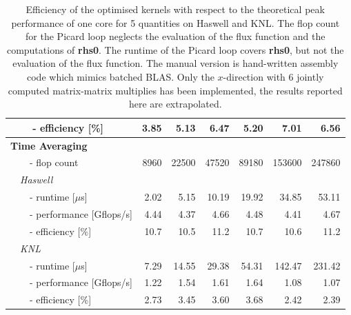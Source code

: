 \documentclass{acm_proc_article-sp}
\begin{document}
\begin{table}
\begin{tabular}{l|rrrrrr}
 ~~~~- efficiency [\%]                  & 3.85 & 5.13 & 6.47& 5.20 & 7.01 & 6.56  \\ \hline
\textbf{Time Averaging}                  &&&&& \\ 
 ~~~~- flop count                            & 8960 & 22500 & 47520 & 89180 & 153600 & 247860 \\
~~\textit{Haswell}            &&&&&&\\
 ~~~~- runtime [$\mu$s]                      & 2.02  & 5.15   & 10.19   & 19.92    & 34.85    & 53.11  \\
 ~~~~- performance [Gflops/s]                & 4.44  & 4.37   & 4.66   & 4.48    & 4.41    & 4.67  \\
 ~~~~- efficiency [\%]                       & 10.7  & 10.5   & 11.2   & 10.7    & 10.6    & 11.2  \\
~~\textit{KNL}            &&&&&&\\
 ~~~~- runtime [$\mu$s]                      & 7.29  & 14.55   & 29.38   & 54.31    & 142.47    & 231.42  \\
 ~~~~- performance [Gflops/s]                &  1.22 & 1.54   & 1.61   & 1.64   & 1.08    & 1.07  \\
 ~~~~- efficiency [\%]                       & 2.73 & 3.45 & 3.60 & 3.68 & 2.42 & 2.39  \\
\end{tabular}
%   
\caption{Efficiency of the optimised kernels with respect to the theoretical peak performance of one core for 5 quantities on Haswell and KNL. The flop count for the Picard loop neglects the evaluation of the flux function and the computations of \textbf{rhs0}. The runtime of the Picard loop covers \textbf{rhs0}, but not the evaluation of the flux function. The manual version is hand-written assembly code which mimics batched BLAS. Only the $x$-direction with 6 jointly computed matrix-matrix multiplies has been implemented, the results reported here are extrapolated. }\label{tab:flopcount}
\end{table}
\end{document}
